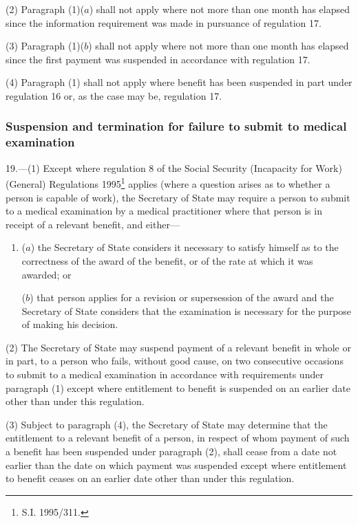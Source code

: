 \documentclass[12pt,a4paper]{article}
\begin{document}
(2) Paragraph (1)($a$) shall not apply where not more than one month has elapsed since the information requirement was made in pursuance of regulation 17.

(3) Paragraph (1)($b$) shall not apply where not more than one month has elapsed since the first payment was suspended in accordance with regulation 17.

(4) Paragraph (1) shall not apply where benefit has been suspended in part under regulation 16 or, as the case may be, regulation 17.

\subsubsection[19. Suspension and termination for failure to submit to medical examination]{Suspension and termination for failure to submit to medical examination}

19.—(1) Except where regulation 8 of the Social Security (Incapacity for Work) (General) Regulations 1995\footnote{\frenchspacing S.I. 1995/311.} applies (where a question arises as to whether a person is capable of work), the Secretary of State may require a person to submit to a medical examination by a medical practitioner where that person is in receipt of a relevant benefit, and either—
\begin{enumerate}\item[]
($a$) the Secretary of State considers it necessary to satisfy himself as to the correctness of the award of the benefit, or of the rate at which it was awarded; or

($b$) that person applies for a revision or supersession of the award and the Secretary of State considers that the examination is necessary for the purpose of making his decision.
\end{enumerate}

(2) The Secretary of State may suspend payment of a relevant benefit in whole or in part, to a person who fails, without good cause, on two consecutive occasions to submit to a medical examination in accordance with requirements under paragraph (1) except where entitlement to benefit is suspended on an earlier date other than under this regulation.

(3) Subject to paragraph (4), the Secretary of State may determine that the entitlement to a relevant benefit of a person, in respect of whom payment of such a benefit has been suspended under paragraph (2), shall cease from a date not earlier than the date on which payment was suspended except where entitlement to benefit ceases on an earlier date other than under this regulation.
\end{document}
